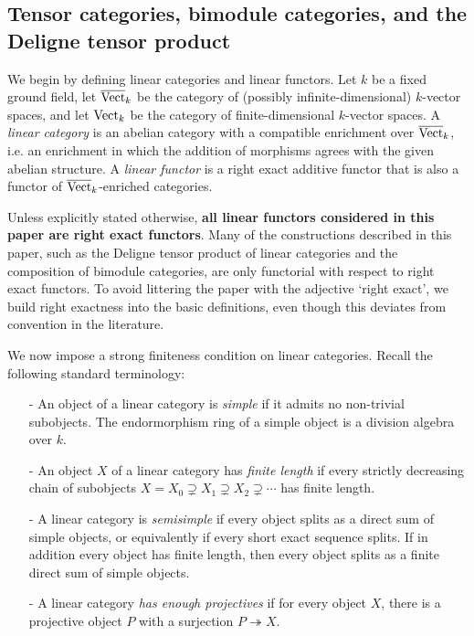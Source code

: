 \documentclass{amsart}
\begin{document}
\subsection{Tensor categories, bimodule categories, and the Deligne tensor product} \label{sec:tc-lincat}

We begin by defining linear categories and linear functors.  Let $k$ be a fixed ground field, let $\overline{\mathrm{Vect}}_k$ be the category of (possibly infinite-dimensional) $k$-vector spaces, and let $\mathrm{Vect}_k$ be the category of finite-dimensional $k$-vector spaces.   A {\em linear category} is an abelian category with a compatible enrichment over $\overline{\mathrm{Vect}}_k$, i.e. an enrichment in which the addition of morphisms agrees with the given abelian structure. A {\em linear functor} is a right exact additive functor that is also a functor of $\overline{\mathrm{Vect}}_k$-enriched categories. 

\begin{warning}
	Unless explicitly stated otherwise, {\bfseries all linear functors considered in this paper are  right exact functors}.  Many of the constructions described in this paper, such as the Deligne tensor product of linear categories and the composition of bimodule categories, are only functorial with respect to right exact functors. To avoid littering the paper with the adjective `right exact', we build right exactness into the basic definitions, even though this deviates from convention in the literature.  
\end{warning}

We now impose a strong finiteness condition on linear categories.  Recall the following standard terminology:
\begin{itemize}
	\item[-] An object of a linear category is {\em simple} if it admits no non-trivial subobjects. The endormorphism ring of a simple object is a division algebra over $k$. %
	\item[-] An object $X$ of a linear category has {\em finite length} if every strictly decreasing chain of subobjects $X = X_0 \supsetneq X_1 \supsetneq X_2 \supsetneq  \cdots$ has finite length. 
	\item[-] A linear category is {\em semisimple} if every object splits as a direct sum of simple objects, or equivalently if every short exact sequence splits. If in addition every object has finite length, then every object splits as a finite direct sum of simple objects. %
	\item[-] A linear category {\em has enough projectives} if for every object $X$, there is a projective object $P$ with a surjection $P \twoheadrightarrow X$. 
\end{itemize}
\end{document}
